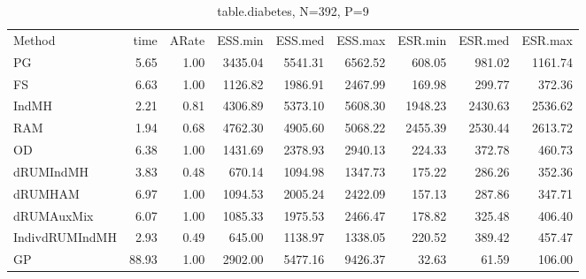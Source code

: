 \begin{table}
\label{tab:blogit-diabetes}
\begin{tabular}{l r r r r r r r r } 
          Method  &     time &    ARate &  ESS.min &  ESS.med &  ESS.max &  ESR.min &  ESR.med &  ESR.max \\ 
              PG  &     5.65 &     1.00 &  3435.04 &  5541.31 &  6562.52 &   608.05 &   981.02 &  1161.74 \\ 
              FS  &     6.63 &     1.00 &  1126.82 &  1986.91 &  2467.99 &   169.98 &   299.77 &   372.36 \\ 
           IndMH  &     2.21 &     0.81 &  4306.89 &  5373.10 &  5608.30 &  1948.23 &  2430.63 &  2536.62 \\ 
             RAM  &     1.94 &     0.68 &  4762.30 &  4905.60 &  5068.22 &  2455.39 &  2530.44 &  2613.72 \\ 
              OD  &     6.38 &     1.00 &  1431.69 &  2378.93 &  2940.13 &   224.33 &   372.78 &   460.73 \\ 
       dRUMIndMH  &     3.83 &     0.48 &   670.14 &  1094.98 &  1347.73 &   175.22 &   286.26 &   352.36 \\ 
         dRUMHAM  &     6.97 &     1.00 &  1094.53 &  2005.24 &  2422.09 &   157.13 &   287.86 &   347.71 \\ 
      dRUMAuxMix  &     6.07 &     1.00 &  1085.33 &  1975.53 &  2466.47 &   178.82 &   325.48 &   406.40 \\ 
  IndivdRUMIndMH  &     2.93 &     0.49 &   645.00 &  1138.97 &  1338.05 &   220.52 &   389.42 &   457.47 \\ 
              GP  &    88.93 &     1.00 &  2902.00 &  5477.16 &  9426.37 &    32.63 &    61.59 &   106.00
 \end{tabular}
\caption{table.diabetes, N=392, P=9}
\end{table}

